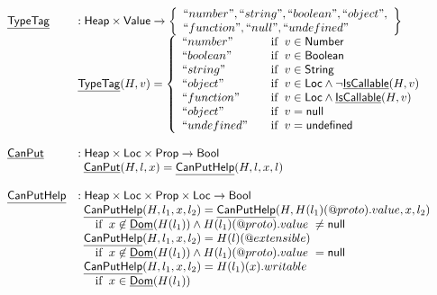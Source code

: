 \[
\begin{array}{ll}
\chf{TypeTag} & : \SF{Heap} \times \SF{Value} \rightarrow \set{``number", ``string", ``boolean", ``object",\\ ``function", ``null", ``undefined"}\\
& \chf{TypeTag}(H,v) = \left\{
\begin{array}{l@{\quad\quad}l}
  ``number" & \ifc{v \in \SF{Number}} \\
  ``boolean" & \ifc{v \in \SF{Boolean}} \\
  ``string" & \ifc{v \in \SF{String}} \\
  ``object" & \ifc{v \in \SF{Loc}\land\lnot\chf{IsCallable}(H,v)} \\
  ``function" & \ifc{v \in \SF{Loc}\land\chf{IsCallable}(H,v)} \\
  ``object" & \ifc{v = \SF{null}} \\
  ``undefined" & \ifc{v = \SF{undefined}} \\
\end{array}
\right. \\
\\

\chf{CanPut} & : \SF{Heap} \times \SF{Loc} \times \SF{Prop} \rightarrow \SF{Bool}\\
&
\begin{array}{ll}
  \chf{CanPut}(H,l,x) = \chf{CanPutHelp}(H,l,x,l) & \\
\end{array}
\\\\

\chf{CanPutHelp} & : \SF{Heap} \times \SF{Loc} \times \SF{Prop} \times \SF{Loc}
\rightarrow \SF{Bool}\\
&
\begin{array}{ll}
  \chf{CanPutHelp}(H,l_1,x,l_2) = \chf{CanPutHelp}(H,H(l_1)(\varprop{proto}).value,x,l_2) &\\
   \quad\ifc{x\not\in\chf{Dom}(H(l_1)) \land H(l_1)(\varprop{proto}).value\ \neq \SF{null}}&\\
  \chf{CanPutHelp}(H,l_1,x,l_2) = H(l)(\varprop{extensible}) &\\
  \quad\ifc{x\not\in\chf{Dom}(H(l_1)) \land H(l_1)(\varprop{proto}).value\ = \SF{null}}&\\
  \chf{CanPutHelp}(H,l_1,x,l_2) = H(l_1)(x).writable &\\
  \quad\ifc{x\in\chf{Dom}(H(l_1))}&\\
\end{array}
\\\\


\end{array}\]
